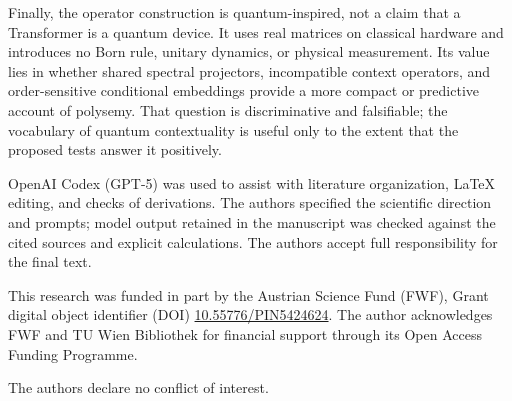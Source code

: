 \documentclass[
  aps,
  reprint,
  superscriptaddress,
  floatfix,
  nofootinbib,
  longbibliography
]{revtex4-2}
\begin{document}
Finally, the operator construction is quantum-inspired, not a claim that a
Transformer is a quantum device.  It uses real matrices on classical hardware
and introduces no Born rule, unitary dynamics, or physical measurement.
Its value lies in whether shared spectral projectors, incompatible context
operators, and order-sensitive conditional embeddings provide a more compact
or predictive account of polysemy.  That question is discriminative and
falsifiable; the vocabulary of quantum contextuality is useful only to the
extent that the proposed tests answer it positively.

\begin{acknowledgments}
OpenAI Codex (GPT-5) was used to assist with literature organization, \LaTeX{}
editing, and checks of derivations.  The authors specified the scientific
direction and prompts; model output retained in the manuscript was checked
against the cited sources and explicit calculations.  The authors accept full
responsibility for the final text.

This research was funded in part by the Austrian
Science Fund (FWF), Grant digital object identifier (DOI)
\href{https://doi.org/10.55776/PIN5424624}{10.55776/PIN5424624}.
The author acknowledges FWF and TU Wien Bibliothek for financial support through its
Open Access Funding Programme.

The authors declare no conflict of interest.
\end{acknowledgments}


\end{document}
